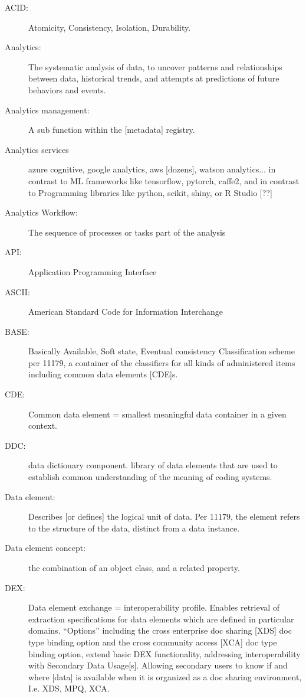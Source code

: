 
\begin{description}

\item[ACID:]	Atomicity, Consistency, Isolation, Durability.

\item[Analytics:]	The systematic analysis of data, to uncover patterns and relationships between data, historical trends, and attempts at predictions of future behaviors and events.  

\item[Analytics management:]	A sub function within the [metadata] registry.

\item[Analytics services]	azure cognitive, google analytics, aws [dozens], watson analytics... in contrast to ML frameworks like tensorflow, pytorch, caffe2, and in contrast to Programming libraries like python, scikit, shiny, or R Studio [??] 


\item[Analytics Workflow:]	The sequence of processes or tasks part of the analysis

\item[API:]	Application Programming Interface

\item[ASCII:]	American Standard Code for Information Interchange

\item[BASE:]	Basically Available, Soft state, Eventual consistency
Classification scheme	per 11179, a container of the classifiers for all kinds of administered items including common data elements [CDE]s. 

\item[CDE:] 	Common data element = smallest meaningful data container in a given context.  

\item[DDC:]	data dictionary component. library of data elements that are used to establish common understanding of the meaning of coding systems.

\item[Data element:]	Describes [or defines] the logical unit of data. Per 11179, the element refers to the structure of the data, distinct from a data instance. 

\item[Data element concept:]	the combination of an object class, and a related property. 

\item[DEX:] 	Data element exchange = interoperability profile. Enables retrieval of extraction specifications for data elements which are defined in particular domains. “Options” including the cross enterprise doc sharing [XDS] doc type binding option and the cross community access [XCA] doc type binding option, extend basic DEX functionality, addressing interoperability with Secondary Data Usage[s]. Allowing secondary users to know if and where [data] is available when it is organized as a doc sharing environment, I.e. XDS, MPQ, XCA. 


\end{description}
